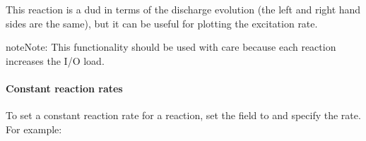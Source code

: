 \documentclass[letterpaper,10pt,english]{sphinxmanual}
\begin{document}
\sphinxAtStartPar
This reaction is a dud in terms of the discharge evolution (the left and right hand sides are the same), but it can be useful for plotting the excitation rate.

\begin{sphinxadmonition}{note}{Note:}
\sphinxAtStartPar
This functionality should be used with care because each reaction increases the I/O load.
\end{sphinxadmonition}


\paragraph{Constant reaction rates}
\label{\detokenize{Applications/CdrPlasmaModel:constant-reaction-rates}}
\sphinxAtStartPar
To set a constant reaction rate for a reaction, set the field  to  and specify the rate.
For example:

\begin{sphinxVerbatim}[commandchars=\\\{\},formatcom=\scriptsize]
  \PYG{p}{[}
       
       
       
  \PYG{p}{]}
\end{sphinxVerbatim}
\end{document}
